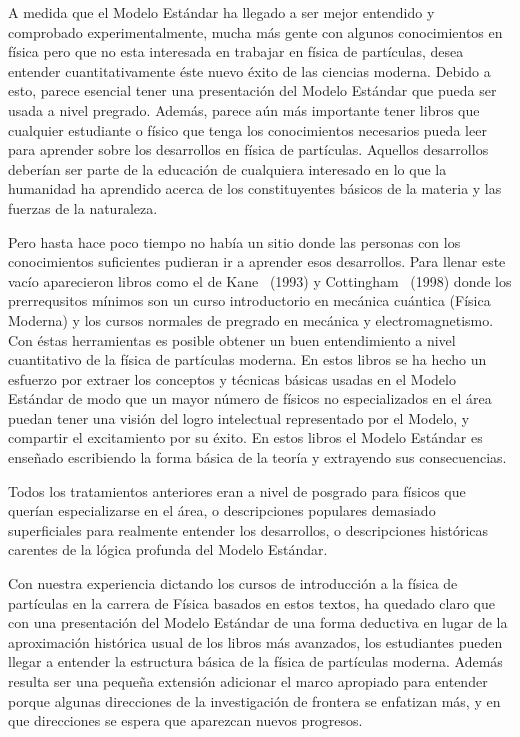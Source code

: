 A medida que el Modelo Estándar ha llegado a ser mejor entendido y comprobado experimentalmente, mucha más gente con algunos conocimientos en física pero que no esta interesada en trabajar en física de partículas, desea entender cuantitativamente éste nuevo éxito de las ciencias moderna. Debido a esto, parece esencial tener una presentación del Modelo Estándar que pueda ser usada a nivel pregrado. Además, parece aún más importante tener libros que cualquier estudiante o físico que tenga los conocimientos necesarios pueda leer para aprender sobre los desarrollos en física de partículas. Aquellos desarrollos deberían ser parte de la educación de cualquiera interesado en lo que la humanidad ha aprendido acerca de los constituyentes básicos de la materia y las fuerzas de la naturaleza. 

Pero hasta hace poco tiempo no había un sitio donde las personas con los conocimientos suficientes pudieran ir a aprender esos desarrollos. Para llenar este vacío aparecieron libros como el de Kane~\cite{kane} (1993) y Cottingham~\cite{cottingham} (1998) donde los prerrequsitos mínimos son un curso introductorio en mecánica cuántica (Física Moderna) y los cursos normales de pregrado en mecánica y electromagnetismo. Con éstas herramientas es posible obtener un buen entendimiento a nivel cuantitativo de la física de partículas moderna. En estos libros se ha hecho un esfuerzo por extraer los conceptos y técnicas básicas usadas en el Modelo Estándar de modo que un mayor número de físicos no especializados en el área puedan tener una visión del logro intelectual representado por el Modelo, y compartir el excitamiento por su éxito. En estos libros el Modelo Estándar es ense\~nado escribiendo la forma básica de la teoría y extrayendo sus consecuencias. 

Todos los tratamientos anteriores eran a nivel de posgrado  para físicos que querían especializarse en el área, o descripciones populares demasiado superficiales para realmente entender los desarrollos, o descripciones históricas carentes de la lógica profunda del Modelo Estándar. 

Con nuestra experiencia dictando los cursos de introducción a la física de partículas en la carrera de Física basados en estos textos, ha quedado claro que con una presentación del Modelo Estándar de una forma deductiva en lugar de la aproximación histórica usual de los libros más avanzados, los estudiantes pueden llegar a entender la estructura básica de la física de partículas moderna. Además resulta ser una peque\~na extensión adicionar el marco apropiado para entender porque algunas direcciones de la investigación de frontera se enfatizan más, y en que direcciones se espera que aparezcan nuevos progresos.

